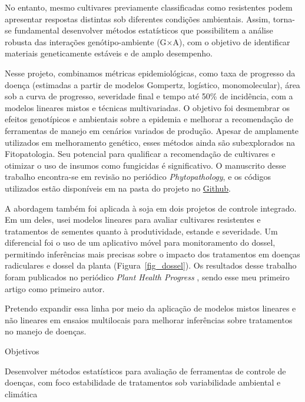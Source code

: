 \documentclass[12pt,a4paper,oneside]{book}
\begin{document}
No entanto, mesmo cultivares previamente classificadas como resistentes podem apresentar respostas distintas sob 
diferentes condições ambientais. Assim, torna-se fundamental desenvolver métodos estatísticos que possibilitem
a análise robusta das interações genótipo-ambiente (G×A), com o objetivo de identificar materiais 
geneticamente estáveis e de amplo desempenho.

Nesse projeto, combinamos métricas epidemiológicas, como taxa de 
progresso da doença (estimadas a partir de modelos Gompertz, logístico, monomolecular), área sob a curva de progresso, 
severidade final e tempo até  50\% de incidência, com a modelos lineares mistos e 
técnicas multivariadas. O objetivo foi desmembrar os efeitos genotípicos e ambientais sobre 
a epidemia e melhorar a recomendação de ferramentas de manejo em cenários variados de produção.
Apesar de amplamente utilizados em melhoramento genético, esses métodos ainda são subexplorados na Fitopatologia. 
Seu potencial para qualificar a recomendação de cultivares e otimizar o uso de insumos como fungicidas é 
significativo. O manuscrito desse trabalho encontra-se em revisão no periódico \emph{Phytopathology}, e os códigos
utilizados estão disponíveis em na pasta do projeto no \href{https://github.com/vcgarnica/SNB_stability}{Github}.

A abordagem também foi aplicada à soja em dois projetos de controle integrado. Em um deles, usei modelos lineares para 
avaliar cultivares resistentes e tratamentos de sementes quanto à produtividade, estande e severidade. 
Um diferencial foi o uso de um aplicativo móvel para monitoramento do dossel, permitindo inferências mais
precisas sobre o impacto dos tratamentos em doenças radiculares e dossel da planta (Figura~\ref{fig_dossel}). 
Os resultados desse trabalho foram publicados no periódico \emph{Plant Health Progress} \citep{Garnica2019}, sendo esse
meu primeiro artigo como primeiro autor.

Pretendo expandir essa linha por meio da aplicação de modelos mistos lineares e não lineares em 
ensaios multilocais para melhorar inferências sobre tratamentos no manejo de doenças. 


\begin{fancyenum}{\faBullseye}{Objetivos}
\item Desenvolver métodos estatísticos para avaliação de ferramentas de controle de doenças, 
  com foco estabilidade de tratamentos sob variabilidade ambiental e climática
\end{fancyenum}
\end{document}
